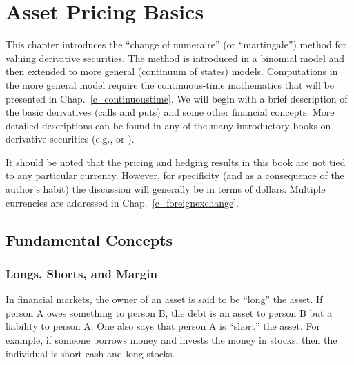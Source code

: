 \chapter{Asset Pricing Basics}\label{c_basics}

This chapter introduces the ``change of numeraire'' (or ``martingale'')  method for valuing derivative securities.  The method is introduced in a binomial model and then extended to more general (continuum of states) models.  Computations in the more general model require the continuous-time mathematics that will be presented in Chap.~\ref{c_continuoustime}.  We will begin with a brief description of the basic derivatives (calls and puts) and some other  financial concepts.  More detailed  descriptions can be found in any of the many introductory books on derivative securities (e.g., \cite{Hull} or \cite{McDonald}).

It should be noted that the pricing and hedging results in this book are not tied to any particular currency.  However, for specificity (and as a consequence of the author's habit) the discussion will generally be in terms of dollars.  Multiple currencies are addressed in Chap.~\ref{c_foreignexchange}.

\section{Fundamental Concepts}\label{s_fundamentalconcepts}

\subsection*{Longs, Shorts, and Margin}

In financial markets, the owner of an asset is said to be ``long'' the asset.   If person A owes something to person B, the debt is an asset to person B but a liability to person A.  One also says that person A is ``short'' the asset.   For example, if someone borrows money and invests the money in stocks, then the individual is short cash and long stocks.  

